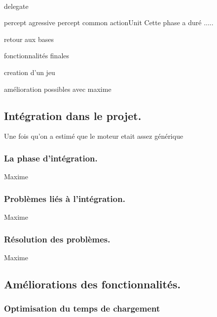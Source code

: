 \documentclass{report}
\begin{document}
\paragraph{}
\paragraph{}
\paragraph{}
\paragraph{}
\paragraph{}
delegate

percept agressive percept common actionUnit
Cette phase a duré .....

retour aux bases

fonctionnalités finales
 
creation d'un jeu

amélioration possibles avec maxime 

\subsection{Intégration dans le projet.}
Une fois qu'on a estimé que le moteur etait assez générique

\subsubsection{La phase d'intégration.} Maxime

\subsubsection{Problèmes liés à l'intégration.} Maxime

\subsubsection{Résolution des problèmes.} Maxime



\subsection{Améliorations des fonctionnalités.}
\subsubsection{Optimisation du temps de chargement}
\end{document}
